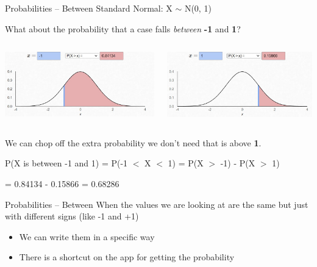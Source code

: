 \documentclass{beamer}
\begin{document}
\begin{frame}{Probabilities -- Between}
Standard Normal: X $\sim$ N(0, 1)

What about the probability that a case falls \textit{between} \textbf{-1} and \textbf{1}? \vspace{8mm}

\begin{columns}
 \begin{column}{0.37\textwidth}
\includegraphics[scale=.38]{img/norm_prob4.jpg}
 \end{column}
 \begin{column}{0.37\textwidth}
\includegraphics[scale=.38]{img/norm_prob5.jpg}
 \end{column}
\end{columns}

We can chop off the extra probability we don't need that is above \textbf{1}. \vspace{8mm}

P(X is between -1 and 1) = P(-1 $<$ X $<$ 1) = P(X $>$ -1) - P(X $>$ 1)

\hspace{41mm} = 0.84134 - 0.15866 = 0.68286
\end{frame}


\begin{frame}{Probabilities -- Between}
When the values we are looking at are the same but just with different signs (like -1 and +1)
\begin{itemize}
    \item We can write them in a specific way
    \item There is a shortcut on the app for getting the probability
\end{itemize}
\end{frame}
\end{document}
